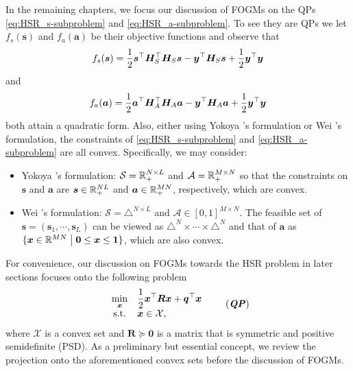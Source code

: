In the remaining chapters, we focus our discussion of FOGMs on the QPs
\eqref{eq:HSR_s-subproblem} and \eqref{eq:HSR_a-subproblem}.
To see they are QPs we let $f_s(\bm s)$ and $f_a(\bm a)$ be their
objective functions and observe that
\begin{equation}
    f_s(\bm s)
    =
    \displaystyle \frac{1}{2} \bm s^\top \bm H_S^\top \bm H_S \bm s -
    \bm y^\top \bm H_S \bm s + \frac{1}{2} \bm y^\top \bm y
    \label{eq:HSR_s-subproblem_expandedform}
\end{equation}
and
\begin{equation}
    f_a(\bm a)
    =
    \displaystyle \frac{1}{2} \bm a^\top \bm H_A^\top \bm H_A \bm a -
    \bm y^\top \bm H_A \bm a + \frac{1}{2} \bm y^\top \bm y
    \label{eq:HSR_a-subproblem_expandedform}
\end{equation}
both attain a quadratic form.
Also, either using Yokoya \etal's formulation or Wei \etal's formulation, the
constraints of \eqref{eq:HSR_s-subproblem} and \eqref{eq:HSR_a-subproblem} are
all convex.
Specifically, we may consider:
\begin{itemize}
    \item Yokoya \etal's formulation: \newline
          $\mathcal S=\mathbb R_+^{N \times L}$ and $\mathcal A=\mathbb R_+^{M \times N}$ so
          that the constraints on $\bm s$ and $\bm a$ are
          $\bm s \in \mathbb R_+^{NL}$ and $\bm a \in \mathbb R_+^{MN}$, respectively, which
          are convex.
    \item Wei \etal's formulation: \newline
          $\mathcal S = \triangle^{N \times L}$ and
          $\mathcal A \in [0,1]^{M \times N}$.
          The feasible set of $\bm s=(\bm s_1,\cdots,\bm s_L)$ can be viewed
          as $\triangle^N\times\cdots\times\triangle^N$
          and that of $\bm a$ as $\{\bm x\in\mathbb R^{MN}\;\big|\;
          \bm 0\leq\bm x\leq\bm1\}$, which are also convex.
\end{itemize}
For convenience, our discussion on FOGMs towards the HSR problem in later
sections focuses onto the following problem
\begin{equation}
    \begin{array}{cl}
        \underset{\bm x}{\min} &
        \displaystyle \frac{1}{2} \bm x\Tr \bm R \bm x + \bm q\Tr \bm x \\
        \text{s.t.} &
        \bm x \in \mathcal X,
    \end{array} \tag{\textbf{\textit{QP}}}
    \label{eq:QP}
\end{equation}
where $\mathcal X$ is a convex set and $\bm R \succeq \bm 0$ is a matrix that
is symmetric and positive semidefinite (PSD).
As a preliminary but essential concept, we review the projection onto the
aforementioned convex sets before the discussion of FOGMs.

